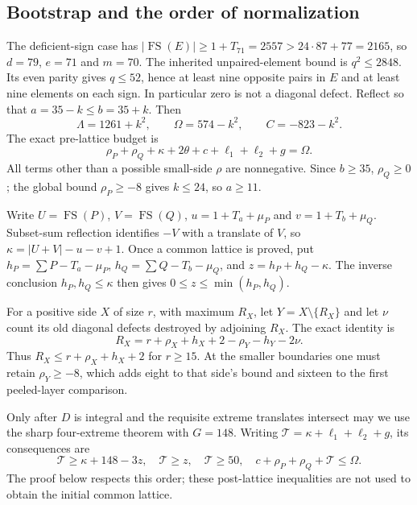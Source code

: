\documentclass[11pt,a4paper]{article}
\theoremstyle{remark}
\newcommand{\FS}{\operatorname{FS}}
\begin{document}
\subsection{Bootstrap and the order of normalization}
The deficient-sign case has
$|\FS(E)|\ge1+T_{71}=2557>24\cdot87+77=2165$, so $d=79$, $e=71$ and
$m=70$. The inherited unpaired-element bound is $q^2\le2848$.
Its even parity gives $q\le52$, hence at least nine opposite pairs in
$E$ and at least nine elements on each sign. In particular zero is
not a diagonal defect. Reflect so that $a=35-k\le b=35+k$. Then
\[
 \Lambda=1261+k^2,\qquad \Omega=574-k^2,\qquad C=-823-k^2.
\]
The exact pre-lattice budget is
\begin{equation}\label{u86:eq:87prebudget}
 \rho_P+\rho_Q+\kappa+2\theta+c+\ell_1+\ell_2+g=\Omega.
\end{equation}
All terms other than a possible small-side $\rho$ are nonnegative.
Since $b\ge35$, $\rho_Q\ge0$; the global bound $\rho_P\ge-8$ gives
$k\le24$, so $a\ge11$.

Write $U=\FS(P)$, $V=\FS(Q)$, $u=1+T_a+\mu_P$ and
$v=1+T_b+\mu_Q$. Subset-sum reflection identifies $-V$ with a translate
of $V$, so $\kappa=|U+V|-u-v+1$. Once a common lattice is proved, put
$h_P=\sum P-T_a-\mu_P$, $h_Q=\sum Q-T_b-\mu_Q$, and
$z=h_P+h_Q-\kappa$. The inverse conclusion $h_P,h_Q\le\kappa$ then
gives $0\le z\le\min(h_P,h_Q)$.

For a positive side $X$ of size $r$, with maximum $R_X$, let
$Y=X\setminus\{R_X\}$ and let $\nu$ count its old diagonal defects
destroyed by adjoining $R_X$. The exact identity is
\begin{equation}\label{u86:eq:87delete}
 R_X=r+\rho_X+h_X+2-\rho_Y-h_Y-2\nu.
\end{equation}
Thus $R_X\le r+\rho_X+h_X+2$ for $r\ge15$. At the smaller boundaries
one must retain $\rho_Y\ge-8$, which adds eight to that side's bound
and sixteen to the first peeled-layer comparison.

Only after $D$ is integral and the requisite extreme translates
intersect may we use the sharp four-extreme theorem with $G=148$.
Writing $\mathcal T=\kappa+\ell_1+\ell_2+g$, its consequences are
\begin{equation}\label{u86:eq:87postbudget}
 \mathcal T\ge\kappa+148-3z,\quad
 \mathcal T\ge z,\quad \mathcal T\ge50,\quad
 c+\rho_P+\rho_Q+\mathcal T\le\Omega.
\end{equation}
The proof below respects this order; these post-lattice inequalities
are not used to obtain the initial common lattice.
\end{document}

